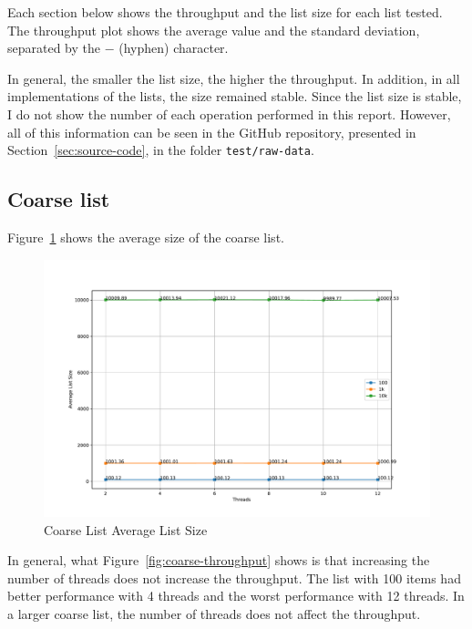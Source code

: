 \documentclass{article}
\begin{document}
Each section below shows the throughput and the list size for each list tested. The throughput plot shows the average value and the standard deviation, separated by the $-$ (hyphen) character.

In general, the smaller the list size, the higher the throughput. In addition, in all implementations of the lists, the size remained stable. Since the list size is stable, I do not show the number of each operation performed in this report. However, all of this information can be seen in the GitHub repository, presented in Section~\ref{sec:source-code}, in the folder \texttt{test/raw-data}.

\subsection{Coarse list}

Figure~\ref{fig:coarse-size} shows the average size of the coarse list.

\begin{figure}[H]
    \centering
    \includegraphics[scale=0.4]{../test/plots/CoarseListAverageListSize.pdf}
    \caption{Coarse List Average List Size}
    \label{fig:coarse-size}
\end{figure}

In general, what Figure~\ref{fig:coarse-throughput} shows is that increasing the number of threads does not increase the throughput. The list with 100 items had better performance with 4 threads and the worst performance with 12 threads. In a larger coarse list, the number of threads does not affect the throughput.
\end{document}
